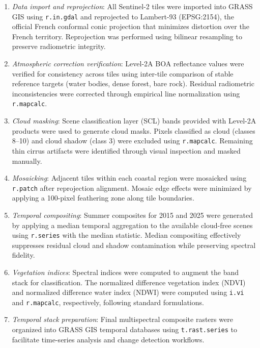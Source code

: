 \documentclass[coasts,article,submit,pdftex,moreauthors]{Definitions/mdpi}
\begin{document}
\begin{enumerate}
\item \textit{Data import and reprojection}: All Sentinel-2 tiles were imported into GRASS GIS using \texttt{r.in.gdal} and reprojected to Lambert-93 (EPSG:2154), the official French conformal conic projection that minimizes distortion over the French territory. Reprojection was performed using bilinear resampling to preserve radiometric integrity.

\item \textit{Atmospheric correction verification}: Level-2A BOA reflectance values were verified for consistency across tiles using inter-tile comparison of stable reference targets (water bodies, dense forest, bare rock). Residual radiometric inconsistencies were corrected through empirical line normalization using \texttt{r.mapcalc}.

\item \textit{Cloud masking}: Scene classification layer (SCL) bands provided with Level-2A products were used to generate cloud masks. Pixels classified as cloud (classes 8--10) and cloud shadow (class 3) were excluded using \texttt{r.mapcalc}. Remaining thin cirrus artifacts were identified through visual inspection and masked manually.

\item \textit{Mosaicking}: Adjacent tiles within each coastal region were mosaicked using \texttt{r.patch} after reprojection alignment. Mosaic edge effects were minimized by applying a 100-pixel feathering zone along tile boundaries.

\item \textit{Temporal compositing}: Summer composites for 2015 and 2025 were generated by applying a median temporal aggregation to the available cloud-free scenes using \texttt{r.series} with the median statistic. Median compositing effectively suppresses residual cloud and shadow contamination while preserving spectral fidelity.

\item \textit{Vegetation indices}: Spectral indices were computed to augment the band stack for classification. The normalized difference vegetation index (NDVI) and normalized difference water index (NDWI) were computed using \texttt{i.vi} and \texttt{r.mapcalc}, respectively, following standard formulations.

\item \textit{Temporal stack preparation}: Final multispectral composite rasters were organized into GRASS GIS temporal databases using \texttt{t.rast.series} to facilitate time-series analysis and change detection workflows.
\end{enumerate}
\end{document}
